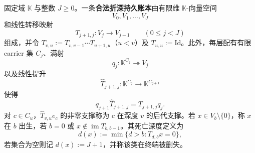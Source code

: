 \begin{definition}[合法折深持久账本]\label{def:distill-persistent-fold-depth-ledger}
固定域 \(\mathbb K\) 与整数 \(J\ge 0\)。一条\textbf{合法折深持久账本}由有限维 \(\mathbb K\)-向量空间
\[
V_0,V_1,\ldots,V_J
\]
和线性转移映射
\[
T_{j+1,j}:V_j\longrightarrow V_{j+1}\qquad(0\le j<J)
\]
组成，并令 \(T_{v,u}:=T_{v,v-1}\cdots T_{u+1,u}\)（\(u<v\)）及 \(T_{u,u}:=\mathrm{Id}\)。此外，每层配有有限 carrier 集 \(C_j\)、满射
\[
q_j:\mathbb K^{C_j}\twoheadrightarrow V_j
\]
以及线性提升
\[
\widehat T_{j+1,j}:\mathbb K^{C_j}\longrightarrow \mathbb K^{C_{j+1}}
\]
使得
\[
q_{j+1}\widehat T_{j+1,j}=T_{j+1,j}q_j .
\]
对 \(c\in C_u\)，\(\widehat T_{v,u}e_c\) 的非零支撑称为 \(c\) 在深度 \(v\) 的后代支撑。若 \(x\in V_b\setminus\{0\}\)，称 \(x\) 在 \(b\) 出生，若 \(b=0\) 或 \(x\notin \operatorname{im}T_{b,b-1}\)。其死亡深度定义为
\[
d(x):=\min\{d>b:T_{d,b}x=0\},
\]
若集合为空则记 \(d(x):=J+1\)，并称该类在终端被删失。
\end{definition}

